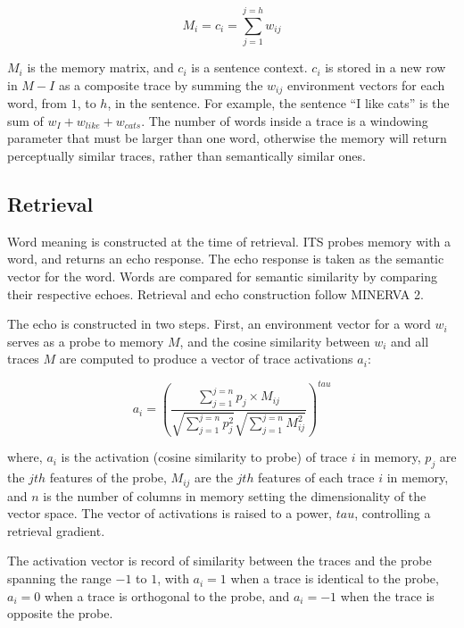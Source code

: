 \documentclass[
  jou]{apa6}
\begin{document}
\begin{equation}
M_i = c_i = \sum_{j=1}^{j=h} w_{ij}
\label{eq:memory}
\end{equation}

\(M_i\) is the memory matrix, and \(c_i\) is a sentence context. \(c_i\) is stored in a new row in \(M-I\) as a composite trace by summing the \(w_{ij}\) environment vectors for each word, from \(1\), to \(h\), in the sentence. For example, the sentence ``I like cats'' is the sum of \(w_{I} + w_{like} + w_{cats}\). The number of words inside a trace is a windowing parameter that must be larger than one word, otherwise the memory will return perceptually similar traces, rather than semantically similar ones.

\hypertarget{retrieval}{%
\subsection{Retrieval}\label{retrieval}}

Word meaning is constructed at the time of retrieval. ITS probes memory with a word, and returns an echo response. The echo response is taken as the semantic vector for the word. Words are compared for semantic similarity by comparing their respective echoes. Retrieval and echo construction follow MINERVA 2.

The echo is constructed in two steps. First, an environment vector for a word \(w_i\) serves as a probe to memory \(M\), and the cosine similarity between \(w_i\) and all traces \(M\) are computed to produce a vector of trace activations \(a_i\):

\begin{equation}
a_i = (\frac{\sum_{j=1}^{j=n}p_j \times M_{ij}}{\sqrt{\sum_{j=1}^{j=n}p_j^2}\sqrt{\sum_{j=1}^{j=n}M_{ij}^2}})^{tau}
\label{eq:activation}
\end{equation}

where, \(a_i\) is the activation (cosine similarity to probe) of trace \(i\) in memory, \(p_j\) are the \(jth\) features of the probe, \(M_{ij}\) are the \(jth\) features of each trace \(i\) in memory, and \(n\) is the number of columns in memory setting the dimensionality of the vector space. The vector of activations is raised to a power, \({tau}\), controlling a retrieval gradient.

The activation vector is record of similarity between the traces and the probe spanning the range \(-1\) to \(1\), with \(a_i = 1\) when a trace is identical to the probe, \(a_i = 0\) when a trace is orthogonal to the probe, and \(a_i = -1\) when the trace is opposite the probe.
\end{document}
